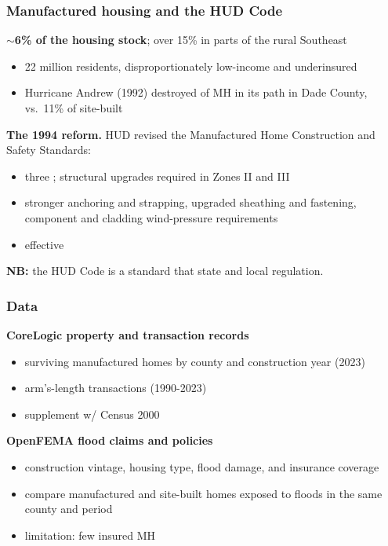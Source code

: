 \documentclass[11pt,xcolor={dvipsnames},hyperref={pdftex,pdfpagemode=UseNone,hidelinks,pdfdisplaydoctitle=true},usepdftitle=false,aspectratio=169]{beamer}
\newcommand{\gc}[1]{{\footnotesize\textcolor{gray}{#1}}}
\begin{document}
\begin{frame}
    \frametitle{Manufactured housing and the HUD Code}
    \small

    \textbf{$\sim$6\% of the housing stock}; over 15\% in parts of the rural Southeast
    \begin{itemize}
        \item 22 million residents, disproportionately low-income and underinsured
        \item Hurricane Andrew (1992) destroyed  of MH in its path in Dade County, vs.\ 11\% of site-built \gc{\citep{noauthor_florida_1995}}
    \end{itemize}

    \vspace{0.8em}
    \pause

    \textbf{The 1994 reform.} HUD revised the Manufactured Home Construction and Safety Standards:
    \begin{itemize}
        \item three ; structural upgrades required in Zones II and III
        \item stronger anchoring and strapping, upgraded sheathing and fastening, component and cladding wind-pressure requirements
        \item effective 
    \end{itemize}

    \vspace{0.8em}
    \pause

    \textbf{NB:} the HUD Code is a  standard that  state and local regulation.

\end{frame}





\begin{frame}
    \frametitle{Data}
    \textbf{CoreLogic property and transaction records}
    \begin{itemize}
        \item surviving manufactured homes by county and construction year (2023)
        \item arm's-length transactions (1990-2023)
        \item supplement w/ Census 2000
    \end{itemize}

    \vspace{0.8em}
    \textbf{OpenFEMA flood claims and policies}
    \begin{itemize}
        \item construction vintage, housing type, flood damage, and insurance coverage
        \item compare manufactured and site-built homes exposed to floods in the same county and period
        \item limitation: few insured MH
    \end{itemize}
\end{frame}
\end{document}
